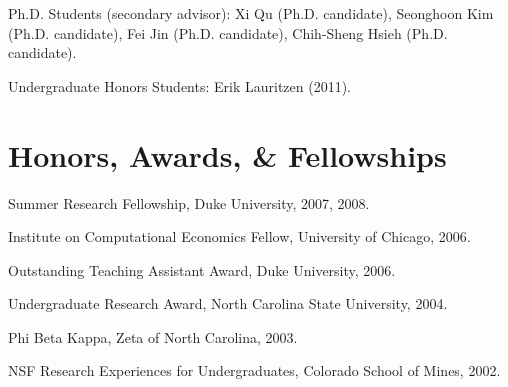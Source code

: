 \documentclass[10pt,letterpaper]{article}
\renewenvironment{itemize}{
  \begin{list}{}{
    \setlength{\leftmargin}{1.5em}
    \setlength{\itemsep}{0.25em}
    \setlength{\parskip}{0pt}
    \setlength{\parsep}{0.25em}
  }
}{
  \end{list}
}
\begin{document}
\begin{itemize}
\item Ph.D. Students (secondary advisor):
  Xi Qu (Ph.D. candidate),            %
  Seonghoon Kim (Ph.D. candidate),    %
  Fei Jin (Ph.D. candidate),          %
  Chih-Sheng Hsieh (Ph.D. candidate). %

\item Undergraduate Honors Students:
  Erik Lauritzen (2011).              %
\end{itemize}

\section*{Honors, Awards, \& Fellowships}

\begin{itemize}
\item Summer Research Fellowship, Duke University, 2007, 2008.
\item Institute on Computational Economics Fellow, University of Chicago, 2006.
\item Outstanding Teaching Assistant Award, Duke University, 2006.
\item Undergraduate Research Award, North Carolina State University, 2004.
\item Phi Beta Kappa, Zeta of North Carolina, 2003.
\item NSF Research Experiences for Undergraduates, Colorado School of Mines, 2002.
\end{itemize}

\end{document}
